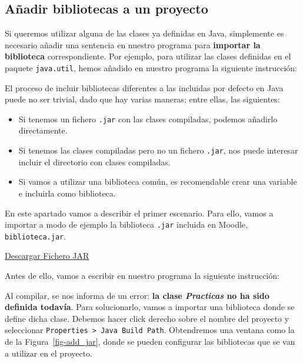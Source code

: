 \documentclass[
  spanish,
  11pt,
  a4paper,
  DIV=11,
  numbers=noendperiod]{scrartcl}
\providecommand{\tightlist}{%
  \setlength{\itemsep}{0pt}\setlength{\parskip}{0pt}}
\begin{document}
\subsection{Añadir bibliotecas a un proyecto}\label{auxf1adir-bibliotecas-a-un-proyecto}

Si queremos utilizar alguna de las clases ya definidas en Java, simplemente es necesario añadir una sentencia en nuestro programa para \textbf{importar la biblioteca} correspondiente. Por ejemplo, para utilizar las clases definidas en el paquete \texttt{java.util}, hemos añadido en nuestro programa la siguiente instrucción:


El proceso de incluir bibliotecas diferentes a las incluidas por defecto en Java puede no ser trivial, dado que hay varias maneras; entre ellas, las siguientes:

\begin{itemize}
\tightlist
\item
 Si tenemos un fichero \texttt{.jar} con las clases compiladas, podemos añadirlo directamente.
\item
 Si tenemos las clases compiladas pero no un fichero \texttt{.jar}, nos puede interesar incluir el directorio con clases compiladas.
\item
 Si vamos a utilizar una biblioteca común, es recomendable crear una variable e incluirla como biblioteca.
\end{itemize}

En este apartado vamos a describir el primer escenario. Para ello, vamos a importar a modo de ejemplo la biblioteca \texttt{.jar} incluida en Moodle, \texttt{biblioteca.jar}.

\href{../resources/practica2/binaries/biblioteca.jar}{Descargar Fichero JAR}

Antes de ello, vamos a escribir en nuestro programa la siguiente instrucción:


Al compilar, se nos informa de un error: \textbf{la clase \emph{Practicas} no ha sido definida todavía}. Para solucionarlo, vamos a importar una biblioteca donde se define dicha clase. Debemos hacer click derecho sobre el nombre del proyecto y seleccionar \texttt{Properties\ \textgreater{}\ Java\ Build\ Path}. Obtendremos una ventana como la de la Figura~\ref{fig-add_jar}, donde se pueden configurar las bibliotecas que se van a utilizar en el proyecto.
\end{document}
